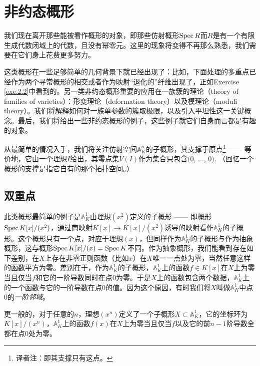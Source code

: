 \section{非约态概形}

我们现在离开那些能被看作概形的对象，即那些仿射概形$\operatorname{Spec} R$而$R$是有一个有限生成代数闭域上的代数，且没有幂零元。这里的现象将变得不再那么熟悉，我们需要在它们身上花费更多努力。

这类概形在一些足够简单的几何背景下就已经出现了：比如，下面处理的多重点已经作为两个寻常概形的相交或者作为映射“退化的”纤维出现了，正如Exercise \ref{exe.2.2}中看到的。另一类非约态概形重要的应用在一族簇的理论（theory of families of varieties）：形变理论（deformation theory）以及模理论（moduli theory）。我们将解释如何对一族单参数的簇取极限，以及引入平坦性这一关键概念。最后，我们将给出一些非约态概形的例子，这些例子就它们自身而言都是有趣的对象。

从最简单的情况入手，我们将关注仿射空间$\mathbb{A}_K^n$的子概形，其支撑于原点\footnote{译者注：即其支撑只有这点。} ------ 等价地，它由一个理想$I$给出，其零点集$V(I)$作为集合只包含$(0$, $\dots$, $0)$. （回忆一个概形的支撑是指它自有的那个拓扑空间。）

\subsection{双重点}
\begin{exa}
	此类概形最简单的例子是$\mathbb{A}_K^1$由理想$(x^2)$定义的子概形 ------ 即概形$\operatorname{Spec} K[x]/(x^2)$，通过商映射$K[x]\to K[x]/(x^2)$诱导的映射看作$\mathbb{A}_K^1$的子概形。这个概形只有一个点，对应于理想$(x)$，但同样作为$\mathbb{A}_K^1$的子概形与作为抽象概形，这与概形$\operatorname{Spec} K[x]/(x)=\operatorname{Spec} K$不同。作为抽象概形，我们能看到存在如下差别，在$X$上存在非零正则函数（比如$x$）在$X$唯一一点处为零，当然任意这样的函数平方为零。差别在于，作为$\mathbb{A}_K^1$的子概形，$\mathbb{A}_K^1$上的函数$f\in K[x]$在$X$上为零当且仅当$f$和它的一阶导数同时在点$0$为零。于是$X$上的函数包含两个数据，$\mathbb{A}_K^1$上的一个函数与它的一阶导数在点$0$的值。因为这个原因，有时我们将$X$叫做$\mathbb{A}_K^1$中点$0$的\textit{一阶邻域}。
\end{exa}

更一般的，对于任意的$n$，理想$(x^n)$定义了一个子概形$X\subset \mathbb{A}_K^1$，它的坐标环为$K[x]/(x^n)$，$\mathbb{A}_K^1$上的函数$f(x)$在$X$上为零当且仅当$f$以及它的前$n-1$阶导数全都在点$0$处为零。

